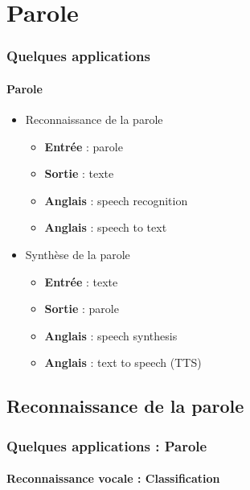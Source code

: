 \documentclass[xcolor=table]{beamer}
\begin{document}
\section{Parole}

\begin{frame}
	\frametitle{Quelques applications}
	\framesubtitle{Parole}
	\begin{itemize}
		\item Reconnaissance de la parole
		\begin{itemize}
			\item \textbf{Entrée} : parole
			\item \textbf{Sortie} : texte
			\item \textbf{Anglais} : speech recognition
			\item \textbf{Anglais} : speech to text
		\end{itemize}
		\item Synthèse de la parole
		\begin{itemize}
			\item \textbf{Entrée} : texte
			\item \textbf{Sortie} : parole
			\item \textbf{Anglais} : speech synthesis
			\item \textbf{Anglais} : text to speech (TTS)
		\end{itemize}
	\end{itemize}
\end{frame}

\subsection{Reconnaissance de la parole}

\begin{frame}
	\frametitle{Quelques applications : Parole}
	\framesubtitle{Reconnaissance vocale : Classification}
\end{frame}


\end{document}
